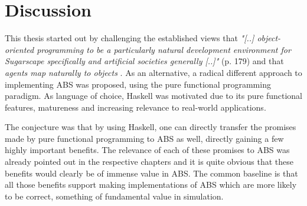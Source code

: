 \chapter{Discussion}
\label{ch:discussion}
This thesis started out by challenging the established views that \textit{"[..] object-oriented programming to be a particularly natural development environment for Sugarscape specifically and artificial societies generally [..]"} \cite{epstein_growing_1996} (p. 179) and that \textit{agents map naturally to objects} \cite{north_managing_2007}. As an alternative, a radical different approach to implementing ABS was proposed, using the pure functional programming paradigm. As language of choice, Haskell was motivated due to its  pure functional features, matureness and increasing relevance to real-world applications. 

The conjecture was that by using Haskell, one can directly transfer the promises made by pure functional programming to ABS as well, directly gaining a few highly important benefits.  The relevance of each of these promises to ABS was already pointed out in the respective chapters and it is quite obvious that these benefits would clearly be of immense value in ABS. The common baseline is that all those benefits support making implementations of ABS which are more likely to be correct, something of fundamental value in simulation.

